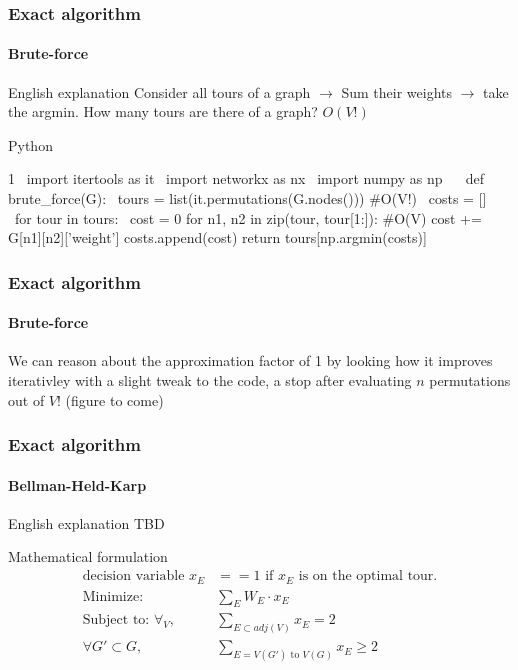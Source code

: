 \documentclass[11pt]{beamer}
\begin{document}
	\begin{frame}
		\frametitle{Exact algorithm}
		\framesubtitle{Brute-force}
		\begin{block}{English explanation}
			Consider all tours of a graph $\rightarrow$ Sum their weights $\rightarrow$ take the argmin.
			How many tours are there of a graph? $O(V!)$
		\end{block}
		\begin{block}{Python}
			\tiny
			\begin{semiverbatim}
			 1 \ import itertools as it \ import networkx as nx \ import numpy as np \  \ def brute\_force(G): \ \quad tours = list(it.permutations(G.nodes())) \#O(V!) \ \quad costs = [] \ \quad for tour in tours: \ \quad cost = 0 \quad for n1, n2 in zip(tour, tour[1:]): \#O(V)	\quad\quad	cost += G[n1][n2]['weight']  \quad	costs.append(cost)  \quad return tours[np.argmin(costs)] 
			\end{semiverbatim}
		\end{block}
	\end{frame}
	\begin{frame}
		\frametitle{Exact algorithm}
		\framesubtitle{Brute-force}
		\centering
		We can reason about the approximation factor of 1 by looking how it improves iterativley with a slight tweak to the code, a stop after evaluating $n$ permutations out of $V!$\newline
		(figure to come)
	\end{frame}
	\begin{frame}
		\frametitle{Exact algorithm}
		\framesubtitle{Bellman-Held-Karp}
		\begin{block}{English explanation}
			TBD
		\end{block}
		\begin{block}{Mathematical formulation}
			\begin{align}
				\text{decision variable } x_E &== 1 \text{ if $x_E$ is on the optimal tour.}\nonumber\\
				\text{Minimize: } & \sum_{E} W_E \cdot x_E\\
				\text{Subject to: } \forall_V, &\sum_{E \subset adj(V)} x_E = 2\\
				\forall G' \subset G, &\sum_{E = V(G') \text{ to } V(G)} x_E \geq 2
			\end{align}
		\end{block}
	\end{frame}
\end{document}
